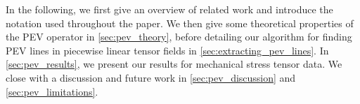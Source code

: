 %
In the following, we first give an overview of related work and introduce the
notation used throughout the paper.
%
We then give some theoretical properties of the \ac{PEV} operator in
\cref{sec:pev_theory}, before detailing our algorithm for finding \ac{PEV} lines in
piecewise linear tensor fields in \cref{sec:extracting_pev_lines}.
%
In \cref{sec:pev_results}, we present our results for mechanical stress tensor
data.
%
We close with a discussion and future work in \cref{sec:pev_discussion} and
\cref{sec:pev_limitations}.
%
\begin{figure}[t]
    \centering
\end{figure}
